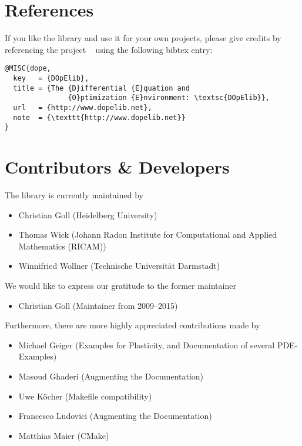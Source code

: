 \newpage
\section{References}
If you like the library and use it for your own projects, please give credits by 
referencing the project \dope{}~\cite{dope} using the following bibtex entry:

\begin{lstlisting}
@MISC{dope,
  key   = {DOpElib},
  title = {The {D}ifferential {E}quation and 
               {O}ptimization {E}nvironment: \textsc{DOpElib}},
  url   = {http://www.dopelib.net},
  note  = {\texttt{http://www.dopelib.net}}
}
\end{lstlisting}


\section{Contributors \& Developers}
\label{sec:contrib}
The library is currently maintained by 
\begin{itemize}
  \item Christian Goll (Heidelberg University)
  \item Thomas Wick (Johann Radon Institute for Computational and Applied Mathematics (RICAM))
  \item Winnifried Wollner (Technische Universität Darmstadt)
\end{itemize}

We would like to express our gratitude to the former maintainer
\begin{itemize}
\item Christian Goll (Maintainer from 2009--2015)
\end{itemize}

Furthermore, there are more highly appreciated contributions
made by %
\begin{itemize}
  \item Michael Geiger (Examples for Plasticity, and Documentation of several PDE-Examples)
  \item Masoud Ghaderi (Augmenting the Documentation)
  \item Uwe K{\"o}cher (Makefile compatibility)
  \item Francesco Ludovici (Augmenting the Documentation)
  \item Matthias Maier (CMake)
\end{itemize}


